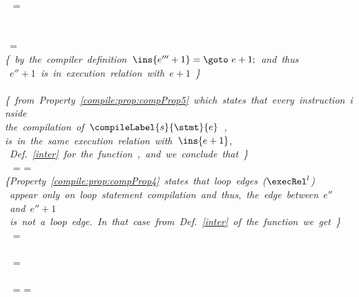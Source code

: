\begin{description}
	 \\
	 \ 	 =  \\\\
	
			
	\mbox{ }\\
	 \ \psi =   \\ 
	\mbox{\rm\textit{\{ by the compiler definition $ \ins{e''' + 1} = \goto \ e +  1; $  and thus}} \\
	\mbox{\rm{\textit{  $e'' + 1$ is in execution relation with $e + 1$ \}} }}\\
	 \  \execRel {} \\
				
				
                               	
	\mbox{\rm\textit{\{ from Property \ref{compile:prop:compProp5} which states that every instruction inside }} \\
	\mbox{\rm\textit{the compilation of $\compileLabel{s}{\stmt}{e}$ , }} \\
        \mbox{\rm\textit{is in the same execution relation with $\ins{e+1}$, }} \\
	\mbox{\rm\textit{    Def. \ref{inter} for the function \interOnly,  and    we conclude that \} } }\\
	  \    =   = \psi\\
	\mbox{\rm\textit{\{Property \ref{compile:prop:compProp4} states that loop edges ($\execRel^{l}$) }} \\
        \mbox{\rm\textit{  appear only on loop statement compilation and thus, the edge between  $e''$ and $e'' + 1$}}\\
	\mbox{\rm\textit{ is not a loop edge. In that case from Def. \ref{inter}  of the function \interOnly{} we get \}  }} \\
	 \  =  \\
	\mbox{\rm {}}\\
	  \  =  \\
				
		\\
		\   = 	= \psi	\\
								


\end{description}
